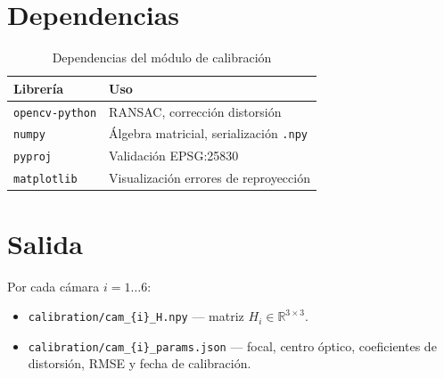 \section{Dependencias}

\begin{table}[h!]
\centering
\begin{tabular}{ll}
\toprule
\textbf{Librería} & \textbf{Uso} \\
\midrule
\texttt{opencv-python} & RANSAC, corrección distorsión \\
\texttt{numpy}         & Álgebra matricial, serialización \texttt{.npy} \\
\texttt{pyproj}        & Validación EPSG:25830 \\
\texttt{matplotlib}    & Visualización errores de reproyección \\
\bottomrule
\end{tabular}
\caption{Dependencias del módulo de calibración}
\end{table}

\section{Salida}

Por cada cámara $i = 1 \ldots 6$:

\begin{itemize}
  \item \texttt{calibration/cam\_\{i\}\_H.npy} --- matriz $H_i \in
        \mathbb{R}^{3\times3}$.
  \item \texttt{calibration/cam\_\{i\}\_params.json} --- focal, centro
        óptico, coeficientes de distorsión, RMSE y fecha de calibración.
\end{itemize}
